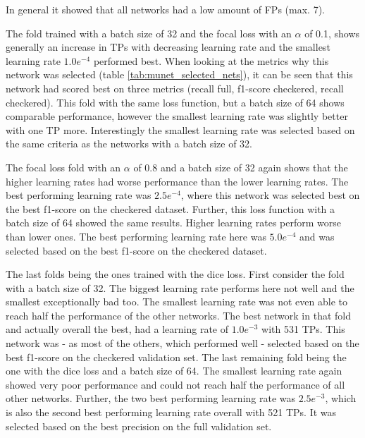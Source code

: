 In general it showed that all networks had a low amount of \acp{FP} (max. 7).

The fold trained with a batch size of 32 and the focal loss with an $\alpha$ of 0.1, shows generally an increase in \acp{TP} with decreasing learning rate and the smallest learning rate $1.0e^{-4}$ performed best.
When looking at the metrics why this network was selected (table \ref{tab:munet_selected_nets}), it can be seen that this network had scored best on three metrics (recall full, f1-score checkered, recall checkered).
This fold with the same loss function, but a batch size of 64 shows comparable performance, however the smallest learning rate was slightly better with one \ac{TP} more.
Interestingly the smallest learning rate was selected based on the same criteria as the networks with a batch size of 32.

The focal loss fold with an $\alpha$ of 0.8 and a batch size of 32  again shows that the higher learning rates had worse performance than the lower learning rates.
The best performing learning rate was $2.5e^{-4}$, where this network was selected best on the best f1-score on the checkered dataset.
Further, this loss function with a batch size of 64 showed the same results.
Higher learning rates perform worse than lower ones.
The best performing learning rate here was $5.0e^{-4}$ and was selected based on the best f1-score on the checkered dataset.

The last folds being the ones trained with the dice loss.
First consider the fold with a batch size of 32.
The biggest learning rate performs here not well and the smallest exceptionally bad too.
The smallest learning rate was not even able to reach half the performance of the other networks.
The best network in that fold and actually overall the best, had a learning rate of $1.0e^{-3}$ with 531 \acp{TP}.
This network was - as most of the others, which performed well - selected based on the best f1-score on the checkered validation set.
The last remaining fold being the one with the dice loss and a batch size of 64.
The smallest learning rate again showed very poor performance and could not reach half the performance of all other networks.
Further, the two best performing learning rate was $2.5e^{-3}$, which is also the second best performing learning rate overall with 521 \acp{TP}.
It was selected based on the best precision on the full validation set.


